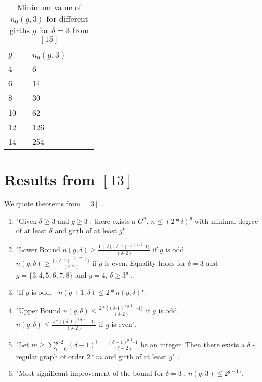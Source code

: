 \documentclass{llncs}
\begin{document}
\begin{table}
\caption{Minimum value of $n_{0}(g,3)$ for different girths $g$ for $\delta =3$ from $[15]$ }
\begin{tabular}{llllll}
\hline\noalign{\smallskip}
$g$ && $n_{0}(g,3)$  \\
\noalign{\smallskip}
\hline
\noalign{\smallskip}
4 && 6   \\
6 && 14\\
8 && 30  \\
10 && 62  \\
12 && 126  \\
14 && 254 \\
\hline
\end{tabular}
\end{table}

\section {Results from $[13]$}
We quote theorems from  $[13]$ .
\begin{enumerate}
\item "Given  $\delta \ge 3$ and  $g\ge 3$ , there exists a $G^{n}$,  $n\le (2\ast \delta )^{g}$ with minimal degree of at least $\delta $ and girth of at least  $g$".
\item "Lower Bound $n(g,\delta )\ge \frac{1+\delta \{(\delta \text{--}1)^{(g\text{--}1)/2}\text{--}1\}}{(\delta \text{--}2)}$ if  $g$ is odd. 
 $n(g,\delta )\ge \frac{\{(\delta \text{--}1)^{(g)/2}\text{--}1\}}{(\delta \text{--}2)}$  if  $g$ is even. 
Equality holds for  $\delta =3$ and  $g=\{3,4,5,6,7,8\}$ and  $g=4$,  $\delta \ge 3$" .
\item "If $g$ is odd, \  $n(g+1,\delta )\le 2\ast n(g,\delta )$".
\item "Upper Bound $n(g,\delta )\le \frac{2\ast \{(\delta \text{--}1)^{(g\text{--}1)}\text{--}1\}}{(\delta \text{--}2)}$  if  $g$ is odd. 
\  $n(g,\delta )\le \frac{4\ast \{(\delta \text{--}1)^{(g\text{--}2)}\text{--}1\}}{(\delta \text{--}2)}$ if  $g$ is even". 
\item "Let  $m\ge \sum _{i=0}^{g\text{--}2}(\delta -1)^{i}=\frac{(\delta -1)^{g\text{--}1}\text{--}1}{(\delta -2)}$ be an integer. Then there exists a  $\delta $ {}-regular graph of order $2\ast m$ and girth of at least  $g$" .
\item "Most significant improvement of the bound for  $\delta =3$ ,  $n(g,3)\le 2^{g-1}$".
\end{enumerate}
\end{document}
